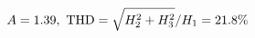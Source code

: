 \documentclass[preview]{standalone}
\begin{document}
\begin{align*}
\special{dvisvgm:raw <g id='unique000'>}A=1.39,\ \text{THD}=\sqrt{H_2^2+H_3^2}/H_1=21.8\%\special{dvisvgm:raw </g>}
\end{align*}
\end{document}
